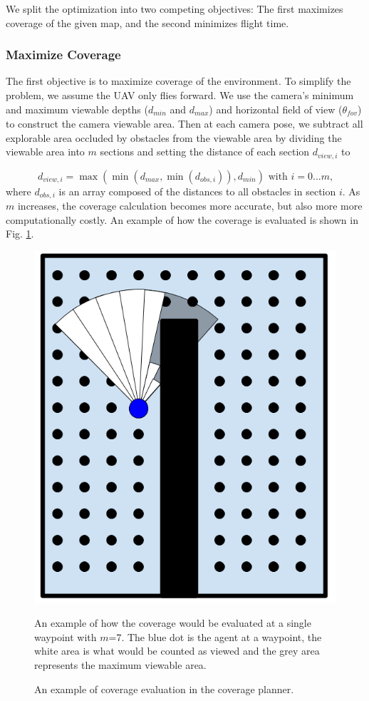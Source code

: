 \documentclass[letterpaper, 10 pt, conference]{ieeeconf}  %
\begin{document}
We split the optimization into two competing objectives: The first maximizes coverage of the given map, and the second minimizes flight time.

\subsubsection{Maximize Coverage}

The first objective is to maximize coverage of the environment.  To simplify the problem, we assume the UAV only flies forward. We use the camera's minimum and maximum viewable depths ($d_{\mathit{min}}$ and $d_{\mathit{max}}$) and horizontal field of view ($\theta_{\mathit{fov}}$) to construct the camera viewable area. Then at each camera pose, we subtract all explorable area occluded by obstacles from the viewable area by dividing the viewable area into $m$ sections and setting the distance of each section $d_{\mathit{view},i}$ to

\begin{equation}
  d_{\mathit{view},i} = \max(\min(d_{\mathit{max}}, \min(d_{\mathit{obs},i})),d_{\mathit{min}}) \text{ with } i = 0...m \text{,}
\end{equation}
%
where $d_{\mathit{obs},i}$ is an array composed of the distances to all obstacles in section $i$. As $m$ increases, the coverage calculation becomes more accurate, but also more more computationally costly. An example of how the coverage is evaluated is shown in Fig. \ref{fig:coverage_sections}.

\begin{figure}
\centering
\includegraphics[width=0.5\linewidth]{coverage_sections.png}
\caption{An example of coverage evaluation in the coverage planner.}{An example of how the coverage would be evaluated at a single waypoint with $m$=7. The blue dot is the agent at a waypoint, the white area is what would be counted as viewed and the grey area represents the maximum viewable area.}
\label{fig:coverage_sections}
\end{figure}
\end{document}

